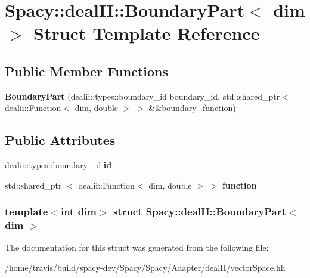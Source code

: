 \hypertarget{structSpacy_1_1dealII_1_1BoundaryPart}{\section{\-Spacy\-:\-:deal\-I\-I\-:\-:\-Boundary\-Part$<$ dim $>$ \-Struct \-Template \-Reference}
\label{structSpacy_1_1dealII_1_1BoundaryPart}
}
\subsection*{\-Public \-Member \-Functions}
\begin{DoxyCompactItemize}
\item 
\hypertarget{structSpacy_1_1dealII_1_1BoundaryPart_ad2f5c0a39760a8b0c5d509e9bd31ae89}{{\bfseries \-Boundary\-Part} (dealii\-::types\-::boundary\-\_\-id boundary\-\_\-id, std\-::shared\-\_\-ptr$<$ dealii\-::\-Function$<$ dim, double $>$ $>$ \&\&boundary\-\_\-function)}\label{structSpacy_1_1dealII_1_1BoundaryPart_ad2f5c0a39760a8b0c5d509e9bd31ae89}

\end{DoxyCompactItemize}
\subsection*{\-Public \-Attributes}
\begin{DoxyCompactItemize}
\item 
\hypertarget{structSpacy_1_1dealII_1_1BoundaryPart_a70eafe6348de871fa5d36d602ff89612}{dealii\-::types\-::boundary\-\_\-id {\bfseries id}}\label{structSpacy_1_1dealII_1_1BoundaryPart_a70eafe6348de871fa5d36d602ff89612}

\item 
\hypertarget{structSpacy_1_1dealII_1_1BoundaryPart_af80025a88e1e848218ee20016b2df0d8}{std\-::shared\-\_\-ptr\*
$<$ dealii\-::\-Function$<$ dim, \*
double $>$ $>$ {\bfseries function}}\label{structSpacy_1_1dealII_1_1BoundaryPart_af80025a88e1e848218ee20016b2df0d8}

\end{DoxyCompactItemize}
\subsubsection*{template$<$int dim$>$ struct Spacy\-::deal\-I\-I\-::\-Boundary\-Part$<$ dim $>$}



\-The documentation for this struct was generated from the following file\-:\begin{DoxyCompactItemize}
\item 
/home/travis/build/spacy-\/dev/\-Spacy/\-Spacy/\-Adapter/deal\-I\-I/vector\-Space.\-hh\end{DoxyCompactItemize}
